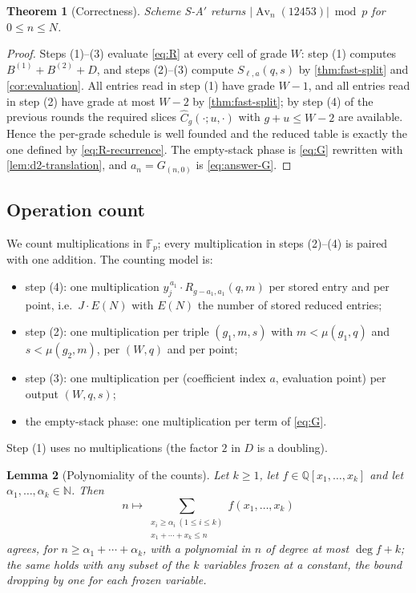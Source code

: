 \documentclass[11pt,reqno]{amsart}
\newtheorem{theorem}{Theorem}[section]
\newtheorem{lemma}[theorem]{Lemma}
\theoremstyle{definition}
\theoremstyle{remark}
\newcommand{\Av}{\operatorname{Av}}
\newcommand{\N}{\mathbb N}
\newcommand{\Chat}{\widehat C}
\begin{document}
\begin{theorem}[Correctness]\label{thm:sa-correct}
Scheme S-A$'$ returns $|\Av_n(12453)|\bmod p$ for $0\leq n\leq N$.
\end{theorem}

\begin{proof}
Steps (1)--(3) evaluate \eqref{eq:R} at every cell of grade $W$: step (1)
computes $B^{(1)}+B^{(2)}+D$, and steps (2)--(3) compute $S_{\ell,a}(q,s)$
by \cref{thm:fast-split} and \cref{cor:evaluation}.  All entries read in
step (1) have grade $W-1$, and all entries read in step (2) have grade at
most $W-2$ by \cref{thm:fast-split}; by step (4) of the previous rounds the
required slices $\Chat_g(\cdot;u,\cdot)$ with $g+u\leq W-2$ are available.
Hence the per-grade schedule is well founded and the reduced table is
exactly the one defined by \eqref{eq:R-recurrence}.  The empty-stack phase
is \eqref{eq:G} rewritten with \cref{lem:d2-translation}, and
$a_n=G_{(n,0)}$ is \eqref{eq:answer-G}.
\end{proof}

\subsection{Operation count}

We count multiplications in $\mathbb F_p$; every multiplication in steps
(2)--(4) is paired with one addition.  The counting model is:
\begin{itemize}
\item[(E)] step (4): one multiplication $y_j^{\,a_1}\cdot
R_{g-a_1,a_1}(q,m)$ per stored entry and per point, i.e.\ $J\cdot E(N)$ with
$E(N)$ the number of stored reduced entries;
\item[(C)] step (2): one multiplication per triple
$(g_1,m,s)$ with $m<\mu(g_1,q)$ and $s<\mu(g_2,m)$, per $(W,q)$ and per
point;
\item[(I)] step (3): one multiplication per (coefficient index $a$,
evaluation point) per output $(W,q,s)$;
\item[(G)] the empty-stack phase: one multiplication per term of
\eqref{eq:G}.
\end{itemize}
Step (1) uses no multiplications (the factor $2$ in $D$ is a doubling).

\begin{lemma}[Polynomiality of the counts]\label{lem:polynomiality}
Let $k\geq1$, let $f\in\mathbb Q[x_1,\ldots,x_k]$ and let
$\alpha_1,\ldots,\alpha_k\in\N$.  Then
\[
 n\longmapsto
 \sum_{\substack{x_i\geq\alpha_i\ (1\leq i\leq k)\\ x_1+\cdots+x_k\leq n}}
 f(x_1,\ldots,x_k)
\]
agrees, for $n\geq\alpha_1+\cdots+\alpha_k$, with a polynomial in $n$ of
degree at most $\deg f+k$; the same holds with any subset of the $k$
variables frozen at a constant, the bound dropping by one for each frozen
variable.
\end{lemma}
\end{document}
